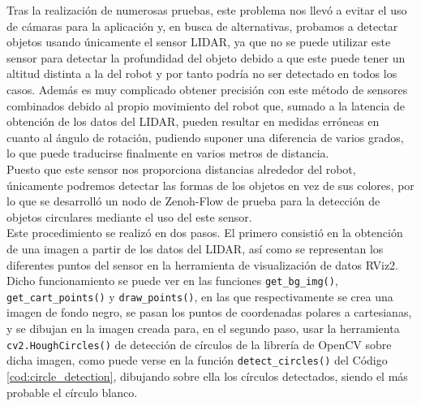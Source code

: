 Tras la realización de numerosas pruebas, este problema nos llevó a evitar el
uso de cámaras para la aplicación y, en busca de alternativas, probamos a
detectar objetos usando únicamente el sensor LIDAR, ya que no se puede utilizar
este sensor para detectar la profundidad del objeto debido a que este puede
tener un altitud distinta a la del robot y por tanto podría no ser detectado en
todos los casos.
Además es muy complicado obtener precisión con este método de sensores
combinados debido al propio movimiento del robot que, sumado a la latencia de
obtención de los datos del LIDAR, pueden resultar en medidas erróneas en cuanto
al ángulo de rotación, pudiendo suponer una diferencia de varios grados, lo que
puede traducirse finalmente en varios metros de distancia.
\\

Puesto que este sensor nos proporciona distancias alrededor del robot,
únicamente podremos detectar las formas de los objetos en vez de sus colores,
por lo que se desarrolló un nodo de Zenoh-Flow de prueba para la detección de
objetos circulares mediante el uso del este sensor.
\\

Este procedimiento se realizó en dos pasos.
El primero consistió en la obtención de una imagen a partir de los datos del
LIDAR, así como se representan los diferentes puntos del sensor en la
herramienta de visualización de datos RViz2.
Dicho funcionamiento se puede ver en las funciones \verb|get_bg_img()|,
\verb|get_cart_points()| y \verb|draw_points()|, en las que respectivamente se
crea una imagen de fondo negro, se pasan los puntos de coordenadas polares a
cartesianas, y se dibujan en la imagen creada para, en el segundo paso, usar la
herramienta \verb|cv2.HoughCircles()| de detección de círculos de la librería de
OpenCV sobre dicha imagen, como puede verse en la función
\verb|detect_circles()| del Código \ref{cod:circle_detection}, dibujando sobre
ella los círculos detectados, siendo el más probable el círculo blanco.
\\


